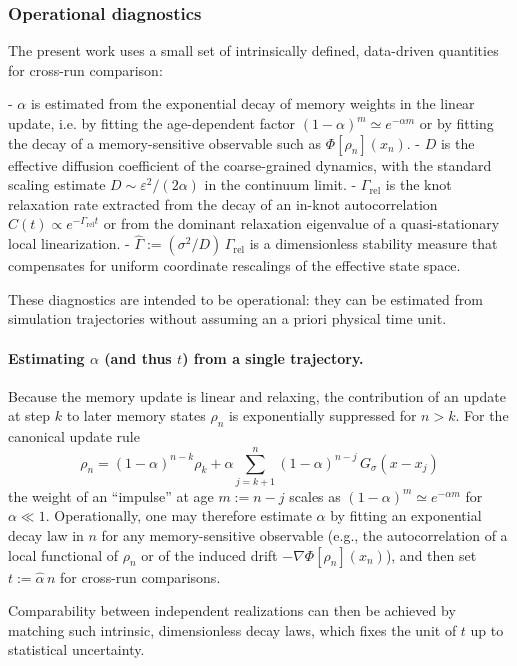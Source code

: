 \documentclass[reprint,amsmath,amssymb,aps,prd,nofootinbib,floatfix]{revtex4-2}
\begin{document}
\subsubsection{Operational diagnostics}

The present work uses a small set of intrinsically defined, data-driven quantities for cross-run comparison:

- $\alpha$ is estimated from the exponential decay of memory weights in the linear update, i.e. by fitting the age-dependent factor $(1-\alpha)^m\simeq e^{-\alpha m}$ or by fitting the decay of a memory-sensitive observable such as $\Phi[\rho_n](x_n)$.
- $D$ is the effective diffusion coefficient of the coarse-grained dynamics, with the standard scaling estimate $D\sim\varepsilon^2/(2\alpha)$ in the continuum limit.
- $\Gamma_{\mathrm{rel}}$ is the knot relaxation rate extracted from the decay of an in-knot autocorrelation $C(t)\propto e^{-\Gamma_{\mathrm{rel}} t}$ or from the dominant relaxation eigenvalue of a quasi-stationary local linearization.
- $\widehat{\Gamma} := (\sigma^2/D)\,\Gamma_{\mathrm{rel}}$ is a dimensionless stability measure that compensates for uniform coordinate rescalings of the effective state space.

These diagnostics are intended to be operational: they can be estimated from simulation trajectories without assuming an a priori physical time unit.

\paragraph{Estimating $\alpha$ (and thus $t$) from a single trajectory.}
Because the memory update is linear and relaxing, the contribution of an update at step $k$ to later memory states $\rho_n$ is exponentially suppressed for $n\!>\!k$.
For the canonical update rule
\begin{equation}\label{eq:rho_linear_solution}
\rho_{n}=(1-\alpha)^{n-k}\rho_{k}
+\alpha\sum_{j=k+1}^{n}(1-\alpha)^{n-j}\,G_\sigma(x-x_{j})
\end{equation}
the weight of an ``impulse'' at age $m:=n-j$ scales as $(1-\alpha)^m\simeq e^{-\alpha m}$ for $\alpha\ll 1$.
Operationally, one may therefore estimate $\alpha$ by fitting an exponential decay law in $n$ for any memory-sensitive observable (e.g., the autocorrelation of a local functional of $\rho_n$ or of the induced drift $-\nabla\Phi[\rho_n](x_n)$), and then set $t:=\widehat{\alpha}\,n$ for cross-run comparisons.

Comparability between independent realizations can then be achieved by matching such intrinsic, dimensionless decay laws, which fixes the unit of $t$ up to statistical uncertainty.
\end{document}

